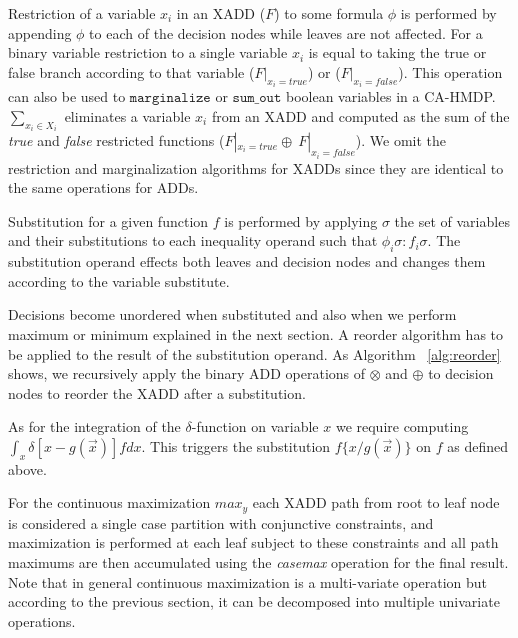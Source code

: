 \documentclass[twoside,11pt]{article}
\begin{document}
Restriction of a variable $x_i$ in an XADD ($F$) to some formula $\phi$ is performed by appending $\phi$ to each of the decision nodes while leaves are not affected. %
For a binary variable restriction to a single variable $x_i$ is equal to taking the true or false branch according to that variable 
($F|_{x_i=true}$) or ($F|_{x_i=false}$). 
This operation can also be used to $\texttt{marginalize}$ or $\texttt{sum\_out}$ boolean variables in a CA-HMDP. 
$\sum_{x_i \in X_i}$ eliminates a variable $x_i$ from an XADD and computed as the sum of the \emph{true} and \emph{false} restricted functions ($F|_{x_i=true} \oplus \ F|_{x_i=false}$). We omit the restriction and marginalization algorithms for XADDs since they are identical to the same operations for ADDs. 

Substitution for a given function $f$ is performed by applying $\sigma$ the set of variables and their substitutions to each inequality operand such that $\phi_i\sigma: f_i\sigma$. The substitution operand effects both leaves and decision nodes and changes them according to the variable substitute. 

Decisions become unordered when substituted and also when we perform maximum or minimum explained in the next section. A reorder algorithm has to be applied to the result of the substitution operand. As Algorithm ~\ref{alg:reorder} shows, we recursively apply the binary ADD operations of $\otimes$ and $\oplus$ to decision nodes to reorder the XADD after a substitution. 

As for the integration of the $\delta$-function on variable $x$ we require computing $\int_{x} \delta [ x - g(\vec{x})]fdx$. This triggers the substitution $f \lbrace x/ g(\vec{x})\rbrace$ on $f$ as defined above.  

For the continuous maximization $max_y$ each XADD path from root to leaf node is considered a single case partition with conjunctive constraints, and maximization is performed at each leaf subject to these constraints and all path maximums are then accumulated using the \textit{casemax} operation for the final result. Note that in general continuous maximization is a multi-variate operation but according to the previous section, it can be decomposed into multiple univariate operations. 
\end{document}
